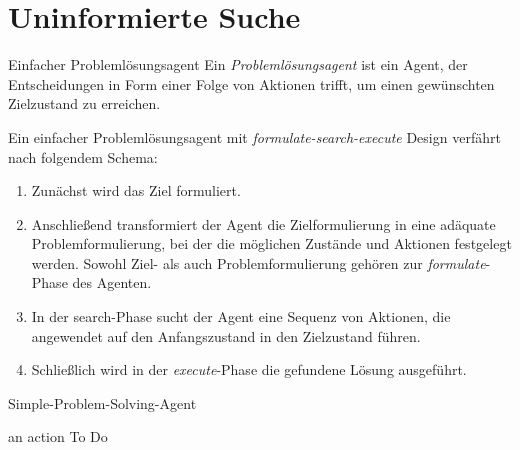 \section{Uninformierte Suche}

\begin{defi}{Einfacher Problemlösungsagent}
    Ein \emph{Problemlösungsagent} ist ein Agent, der Entscheidungen in Form einer Folge von Aktionen trifft, um einen gewünschten Zielzustand zu erreichen.

    Ein einfacher Problemlösungsagent mit \emph{formulate-search-execute} Design verfährt nach folgendem Schema:
    \begin{enumerate}
        \item Zunächst wird das Ziel formuliert.
        \item Anschließend transformiert der Agent die Zielformulierung in eine adäquate Problemformulierung, bei der die möglichen Zustände und Aktionen festgelegt werden.
              Sowohl Ziel- als auch Problemformulierung gehören zur \emph{formulate}-Phase des Agenten.
        \item In der search-Phase sucht der Agent eine Sequenz von Aktionen, die angewendet auf den Anfangszustand in den Zielzustand führen.
        \item Schließlich wird in der \emph{execute}-Phase die gefundene Lösung ausgeführt.
    \end{enumerate}
\end{defi}

\begin{algo}{Simple-Problem-Solving-Agent}
    \begin{algorithmic}
         \State\Return an action
        To Do
        \EndFunction
    \end{algorithmic}
\end{algo}

